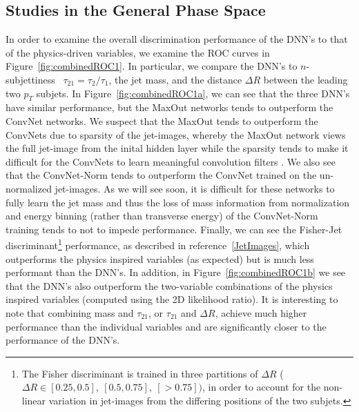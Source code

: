
\subsection{Studies in the General Phase Space} %
\label{sub:coarse_studies}

In order to examine the overall discrimination performance of the DNN's to that of the physics-driven variables, we examine the ROC curves in Figure~\ref{fig:combinedROC1}. In particular, we compare the DNN's to $n$-subjettiness~\cite{nsub} $\tau_{21} = \tau_{2}/\tau_{1}$, the jet mass, and the distance $\Delta R$ between the leading two $p_{T}$ subjets.  In Figure~\ref{fig:combinedROC1a}, we can see that the three DNN's have similar performance, but the MaxOut networks tends to outperform the ConvNet networks.  We suspect that the MaxOut tends to outperform the ConvNets due to sparsity of the jet-images, whereby the MaxOut network views the full jet-image from the inital hidden layer while the sparsity tends to make it difficult for the ConvNets to learn meaningful convolution filters .  We also see that the ConvNet-Norm tends to outperform the ConvNet trained on the un-normalized jet-images.  As we will see soon,  it is difficult for these networks to fully learn the jet mass and thus the loss of mass information from normalization and energy  binning (rather than transverse energy) of the ConvNet-Norm training tends to not to impede performance.   Finally, we can see the Fisher-Jet discriminant\footnote{The Fisher discriminant is trained in three partitions of $\Delta  R$ ($\Delta R \in [0.25, 0.5],\ [0.5, 0.75],\ [>0.75])$, in order to account for the non-linear variation in jet-images from the differing positions of the two subjets.} performance, as described in reference~\ref{JetImages}, which outperforms the physics inspired variables (as expected) but is much less performant than the DNN's. In addition, in Figure~\ref{fig:combinedROC1b} we see that the DNN's also outperform the two-variable combinations of the physics inspired variables (computed using the 2D likelihood ratio).   It is interesting to note that combining mass and $\tau_{21}$, or $\tau_{21}$ and $\Delta R$, achieve much higher performance than the individual variables and are significantly closer to the performance of the DNN's.
